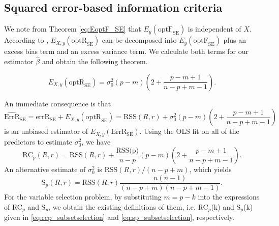 \subsection{Squared error-based information criteria}
We note from Theorem \ref{eq:EoptF_SE} that $E_y(\text{optF}_\text{SE})$ is independent of $X$. According to \citet[formula 6 and proposition 1]{rosset2020fixed}, $E_{X,y}(\text{optR}_\text{SE})$ can be decomposed into $E_y(\text{optF}_\text{SE})$ plus an excess bias term and an excess variance term. We calculate both terms for our estimator $\hat\beta$ and obtain the following theorem.
\begin{theorem}
\begin{equation*}
E_{X,y}(\text{optR}_\text{SE}) = \sigma_0^2(p-m) \left( 2+ \frac{p-m+1}{n-p+m-1} \right).
\end{equation*}
\label{thm:EoptR_SE}
\end{theorem}
An immediate consequence is that
\begin{equation*}
\widehat{\text{ErrR}}_\text{SE} = \text{errR}_\text{SE} + E_{X,y} (\text{optR}_\text{SE}) = \text{RSS}(R,r) + \sigma_0^2(p-m) \left( 2+ \frac{p-m+1}{n-p+m-1} \right)
\end{equation*}
is an unbiased estimator of $E_{X,y}(\text{ErrR}_\text{SE})$. Using the OLS fit on all of the predictors to estimate $\sigma_0^2$, we have 
\begin{equation*}
\text{RC}_p(R,r) = \text{RSS}(R,r) + \frac{\text{RSS(p)}}{n-p}(p-m) \left(2+\frac{p-m+1}{n-p+m-1}\right).
\end{equation*}
An alternative estimate of $\sigma_0^2$ is $\text{RSS}(R,r)/(n-p+m)$, which yields 
\begin{equation*}
\text{S}_p(R,r) = \text{RSS}(R,r)\frac{n(n-1)}{(n-p+m)(n-p+m-1)}.
\end{equation*}
For the variable selection problem, by substituting $m=p-k$ into the expressions of RC$_p$ and S$_p$, we obtain the existing definitions of them, i.e. RC$_p$(k) and S$_p$(k) given in \eqref{eq:rcp_subsetselection} and \eqref{eq:sp_subsetselection}, respectively. 
